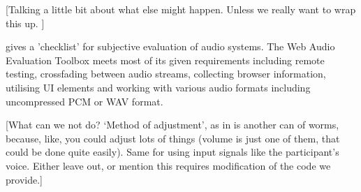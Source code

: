 \documentclass{sig-alternate}
\begin{document}
	[Talking a little bit about what else might happen. Unless we really want to wrap this up. ]
	
	\cite{schoeffler2015mushra} gives a 'checklist' for subjective evaluation of audio systems. The Web Audio Evaluation Toolbox meets most of its given requirements including remote testing, crossfading between audio streams, collecting browser information, utilising UI elements and working with various audio formats including uncompressed PCM or WAV format.

	[What can we not do? `Method of adjustment', as in \cite{schoeffler2015mushra} is another can of worms, because, like, you could adjust lots of things (volume is just one of them, that could be done quite easily). Same for using input signals like the participant's voice. Either leave out, or mention this requires modification of the code we provide.]

%

%
%
\end{document}
